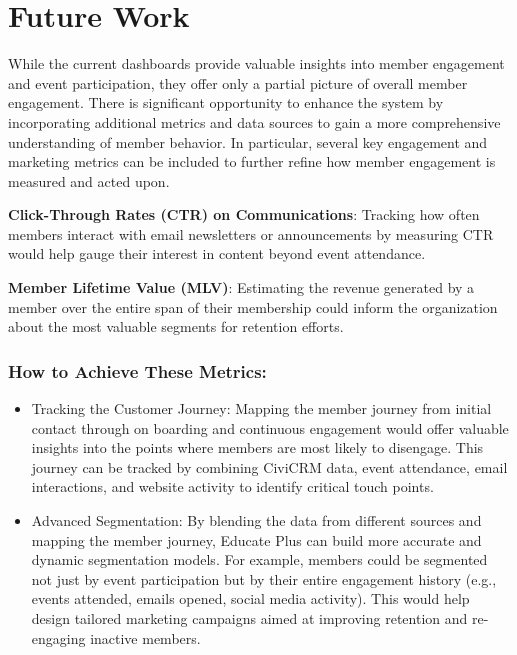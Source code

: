 \documentclass[11pt,a4paper,]{article}
\begin{document}
\section{Future Work}\label{future-work}

While the current dashboards provide valuable insights into member engagement and event participation, they offer only a partial picture of overall member engagement. There is significant opportunity to enhance the system by incorporating additional metrics and data sources to gain a more comprehensive understanding of member behavior. In particular, several key engagement and marketing metrics can be included to further refine how member engagement is measured and acted upon.

\textbf{Click-Through Rates (CTR) on Communications}: Tracking how often members interact with email newsletters or announcements by measuring CTR would help gauge their interest in content beyond event attendance.

\textbf{Member Lifetime Value (MLV)}: Estimating the revenue generated by a member over the entire span of their membership could inform the organization about the most valuable segments for retention efforts.

\subsubsection{How to Achieve These Metrics:}\label{how-to-achieve-these-metrics}

\begin{itemize}
\item
  Tracking the Customer Journey: Mapping the member journey from initial contact through on boarding and continuous engagement would offer valuable insights into the points where members are most likely to disengage. This journey can be tracked by combining CiviCRM data, event attendance, email interactions, and website activity to identify critical touch points.
\item
  Advanced Segmentation: By blending the data from different sources and mapping the member journey, Educate Plus can build more accurate and dynamic segmentation models. For example, members could be segmented not just by event participation but by their entire engagement history (e.g., events attended, emails opened, social media activity). This would help design tailored marketing campaigns aimed at improving retention and re-engaging inactive members.
\end{itemize}
\end{document}

